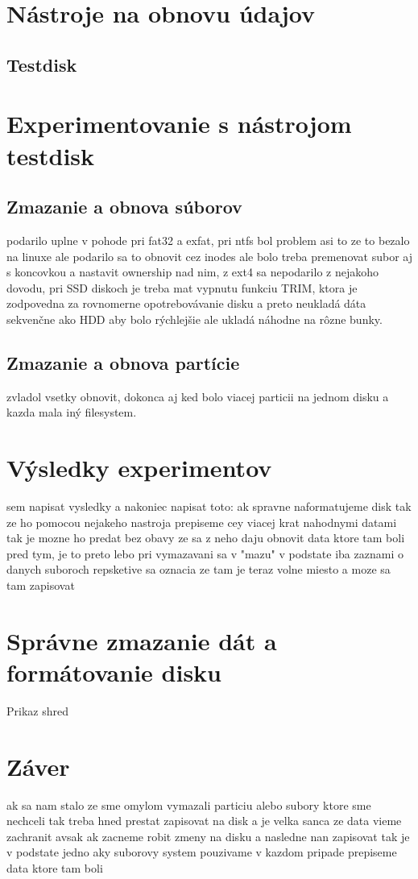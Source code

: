 \documentclass[12pt,oneside,slovak,a4paper]{article}
\begin{document}

\section{Nástroje na obnovu údajov}


\subsection{Testdisk}


\section{Experimentovanie s nástrojom testdisk}


\subsection{Zmazanie a obnova súborov}
podarilo uplne v pohode pri fat32 a exfat, pri ntfs bol problem asi to ze to bezalo na linuxe ale podarilo sa to obnovit cez inodes ale bolo treba premenovat subor aj s koncovkou a nastavit ownership nad nim, z ext4 sa nepodarilo z nejakoho dovodu, pri SSD diskoch je treba mat vypnutu funkciu TRIM, ktora je zodpovedna za rovnomerne opotrebovávanie disku a preto neukladá dáta sekvenčne ako HDD aby bolo rýchlejšie ale ukladá náhodne na rôzne bunky.


\subsection{Zmazanie a obnova partície}
zvladol vsetky obnovit, dokonca aj ked bolo viacej particii na jednom disku a kazda mala iný filesystem.

\section{Výsledky experimentov}
sem napisat vysledky a nakoniec napisat toto: ak spravne naformatujeme disk tak ze ho pomocou nejakeho nastroja prepiseme cey viacej krat nahodnymi datami tak je mozne ho predat bez obavy ze sa z neho daju obnovit data ktore tam boli pred tym, je to preto lebo pri vymazavani sa v "mazu" v podstate iba zaznami o danych suboroch repsketive sa oznacia ze tam je teraz volne miesto a moze sa tam zapisovat

\section{Správne zmazanie dát a formátovanie disku}
Prikaz shred

\section{Záver}
ak sa nam stalo ze sme omylom vymazali particiu alebo subory ktore sme nechceli tak treba hned prestat zapisovat na disk a je velka sanca ze data vieme zachranit avsak ak zacneme robit zmeny na disku a nasledne nan zapisovat tak je v podstate jedno aky suborovy system pouzivame v kazdom pripade prepiseme data ktore tam boli




\end{document}
